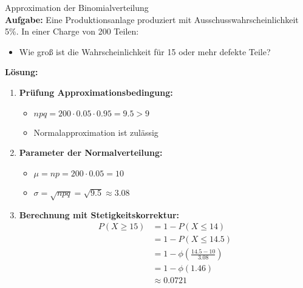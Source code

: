 \begin{example2}{Approximation der Binomialverteilung}\\
\textbf{Aufgabe:} Eine Produktionsanlage produziert mit Ausschusswahrscheinlichkeit 5\%. In einer Charge von 200 Teilen:
\begin{itemize}
\item Wie groß ist die Wahrscheinlichkeit für 15 oder mehr defekte Teile?
\end{itemize}

\textbf{Lösung:}
\begin{enumerate}
\item \textbf{Prüfung Approximationsbedingung:}
   \begin{itemize}
   \item $npq = 200 \cdot 0.05 \cdot 0.95 = 9.5 > 9$
   \item Normalapproximation ist zulässig
   \end{itemize}

\item \textbf{Parameter der Normalverteilung:}
   \begin{itemize}
   \item $\mu = np = 200 \cdot 0.05 = 10$
   \item $\sigma = \sqrt{npq} = \sqrt{9.5} \approx 3.08$
   \end{itemize}

\item \textbf{Berechnung mit Stetigkeitskorrektur:}
   \begin{align*}
   P(X \geq 15) &= 1 - P(X \leq 14) \\
   &= 1 - P(X \leq 14.5) \\
   &= 1 - \phi(\frac{14.5-10}{3.08}) \\
   &= 1 - \phi(1.46) \\
   &\approx 0.0721
   \end{align*}
\end{enumerate}
\end{example2}

